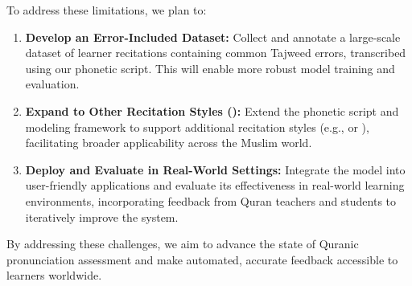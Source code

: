 To address these limitations, we plan to:

\begin{enumerate}
\item \textbf{Develop an Error-Included Dataset:}
Collect and annotate a large-scale dataset of learner recitations containing common Tajweed errors, transcribed using our phonetic script. This will enable more robust model training and evaluation.

\item \textbf{Expand to Other Recitation Styles ():}
Extend the phonetic script and modeling framework to support additional recitation styles (e.g.,  or ), facilitating broader applicability across the Muslim world.

\item \textbf{Deploy and Evaluate in Real-World Settings:}
Integrate the model into user-friendly applications and evaluate its effectiveness in real-world learning environments, incorporating feedback from Quran teachers and students to iteratively improve the system.
\end{enumerate}

By addressing these challenges, we aim to advance the state of Quranic pronunciation assessment and make automated, accurate feedback accessible to learners worldwide.

